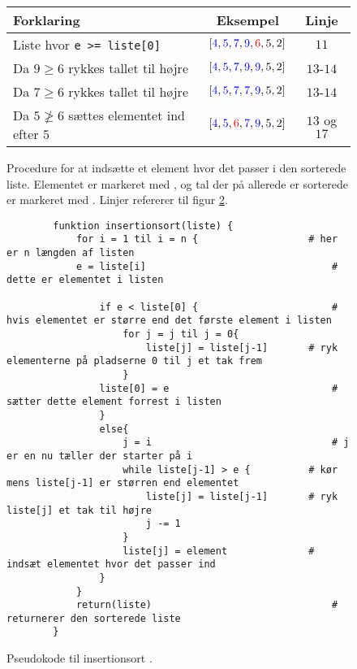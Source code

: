 \begin{figure}[h]
	\begin{center}
		\padtable
		\begin{tabular}{l|c|c}
			Forklaring & Eksempel & Linje\\
			\hline
			Liste hvor \verb|e >= liste[0]| & $[\color{blue}4\color{black},\color{blue}5\color{black},\color{blue}7\color{black},\color{blue}9\color{black},\color{red}6\color{black},5,2]$ &$11$\\
			Da $9 \geq 6$ rykkes tallet til højre & $[\color{blue}4\color{black},\color{blue}5\color{black},\color{blue}7\color{black},\color{blue}9\color{black},\color{blue}9\color{black},5,2]$ & $13$-$14$\\
			Da $7 \geq 6$ rykkes tallet til højre & $[\color{blue}4\color{black},\color{blue}5\color{black},\color{blue}7\color{black},\color{blue}7\color{black},\color{blue}9\color{black},5,2]$ & $13$-$14$\\
			Da $5 \ngeq 6$ sættes elementet ind efter $5$ & $[\color{blue}4\color{black},\color{blue}5\color{black},\color{red}6\color{black},\color{blue}7\color{black},\color{blue}9\color{black},5,2]$ & $13$ og $17$
		\end{tabular}
	\end{center}
	\vspace{-3mm}
	\caption{Procedure for at indsætte et element hvor det passer i den sorterede liste. Elementet er markeret med , og tal der på allerede er sorterede er markeret med . Linjer refererer til figur \ref{fig:Pseudokode til insertionsort}.}
	\label{fig:Indsæt element hvor det passer i listen}
\end{figure}

\begin{figure}[h]
	\begin{center}
		\begin{lstlisting}
		funktion insertionsort(liste) {
			for i = 1 til i = n {					# her er n længden af listen
			e = liste[i]	 							# dette er elementet i listen

				if e < liste[0] {						# hvis elementet er større end det første element i listen
					for j = j til j = 0{ 
						liste[j] = liste[j-1]		# ryk elementerne på pladserne 0 til j et tak frem
					}
				liste[0] = e 							# sætter dette element forrest i listen
				}
				else{
					j = i 								# j er en nu tæller der starter på i
					while liste[j-1] > e {			# kør mens liste[j-1] er størren end elementet
						liste[j] = liste[j-1] 		# ryk liste[j] et tak til højre
						j -= 1
					}
					liste[j] = element				# indsæt elementet hvor det passer ind
				}
			}			
			return(liste)								# returnerer den sorterede liste
		}
		\end{lstlisting}
	\end{center}
	\vspace{-5mm}
	\caption{Pseudokode til insertionsort \cite[s. 104]{aogd}.}
	\label{fig:Pseudokode til insertionsort}
\end{figure}



